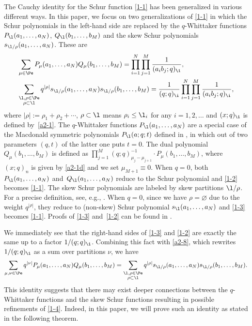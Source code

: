  The Cauchy identity for the Schur function \eqref{1-1} has been generalized in various different ways. In this paper, we focus on two generalizations of \eqref{1-1} in which the Schur polynomials in the left-hand side are replaced by the $q$-Whittaker functions $P_{\l}(a_1,\dots,a_N)$, $Q_{\l}(b_1,\dots,b_M)$ and the skew Schur polynomials $s_{\l/\rho}(a_1,\dots,a_N)$. These are
 \begin{align}
 \label{1-3}
 &\sum_{\mu\in\Pe}P_{\mu}(a_1,\dots,a_N)
 Q_{\mu}(b_1,\dots,b_M)
 =
 \prod_{i=1}^N\prod_{j=1}^M\frac{1}{(a_ib_j;q)_{\i}},
 \\
 \label{1-2}
 &\sum_{\substack{\l,\rho\in\Pe\\
 \rho\subset \l
 }}q^{|\rho|}s_{\l/\rho}(a_1,\dots,a_N)s_{\l/\rho}(b_1,\dots,b_M)
 =
 \frac{1}{(q;q)_\i}
 \prod_{i=1}^N\prod_{j=1}^M\frac{1}{(a_ib_j;q)_{\i}},
 \end{align}
 where $|\rho|:=\rho_1+\rho_2+\cdots$, $\rho\subset\l$ means $\rho_i\le \l_i$ for any $i=1,2,\dots$ and $(x;q)_{\i}$ is defined by~\eqref{a2-1}. The $q$-Whittaker functions $P_{\l}(a_1,\dots,a_N)$ are a special case of the Macdonald symmetric polynomials $P_{\l}(a;q;t)$ defined in \cite[Chapter~VI]{macdonald1998symmetric}, in which out of two parameters $(q,t)$ of the latter one puts $t=0$. The dual polynomial $Q_{\mu}(b_1,\dots,b_M)$ is defined as
 $
 \prod_{j=1}^M (q;q)_{\mu_j-\mu_{j+1}}^{-1}\cdot P_{\mu}(b_1,\dots,b_M)$,
 where $(x;q)_n$ is given by \eqref{a2-1d} and we set $\mu_{M+1}\equiv 0$. When $q=0$, both $P_{\l}(a_1,\dots,a_N)$ and~${Q_{\l}(a_1,\dots,a_N)}$ reduce to the Schur polynomial and \eqref{1-2} becomes \eqref{1-1}. The skew Schur polynomials  are labeled by skew partitions $\l/\rho$. For a precise definition, see, e.g., \cite[Chapter~I]{macdonald1998symmetric}. When $q=0$, since we have $\rho=\varnothing$ due to the weight $q^{|\rho|}$, they reduce to (non-skew) Schur polynomial $s_{\l}(a_1,\dots,a_N)$ and \eqref{1-3} becomes \eqref{1-1}. Proofs of \eqref{1-3} and~\eqref{1-2} can be found in \cite[Sections~VI.4 and~I.5.28\,(a)]{macdonald1998symmetric}.

 We immediately see that the right-hand sides of \eqref{1-3} and \eqref{1-2} are exactly the same up to a factor $1/(q;q)_{\i}$. Combining this fact with \eqref{a2-8}, which rewrites $1/(q;q)_{\i}$ as a sum over partitions $\nu$, we have
 \begin{align}
 \label{1-4}
 \sum_{\mu,\nu\in\Pe}q^{|\nu|}P_{\mu}(a_1,\dots,a_N)
 Q_{\mu}(b_1,\dots,b_M)
 =
 \sum_{\substack{\l,\rho\in\Pe\\ \rho\subset\l}}q^{|\rho|}s_{\l/\rho}(a_1,\dots,a_N)s_{\l/\rho}(b_1,\dots,b_M).
 \end{align}
 This identity suggests that there may exist deeper connections between the $q$-Whittaker functions and the skew Schur functions resulting in possible refinements of \eqref{1-4}.
 Indeed, in this paper, we will prove such an identity as stated in the following theorem.

